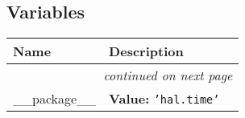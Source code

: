 
  \subsection{Variables}

    \vspace{-1cm}
\hspace{\varindent}\begin{longtable}{|p{\varnamewidth}|p{\vardescrwidth}|l}
\cline{1-2}
\cline{1-2} \centering \textbf{Name} & \centering \textbf{Description}& \\
\cline{1-2}
\endhead\cline{1-2}\multicolumn{3}{r}{\small\textit{continued on next page}}\\\endfoot\cline{1-2}
\endlastfoot\raggedright \_\-\_\-p\-a\-c\-k\-a\-g\-e\-\_\-\_\- & \raggedright \textbf{Value:} 
{\tt \texttt{'}\texttt{hal.time}\texttt{'}}&\\
\cline{1-2}
\end{longtable}

